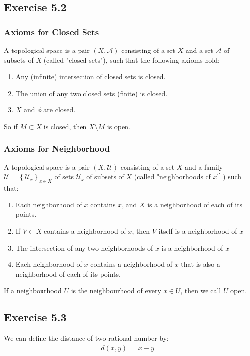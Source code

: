 \documentclass[]{ctexart}
\begin{document}
	\subsection{Exercise 5.2}
		\subsubsection{Axioms for Closed Sets}
			A topological space is a pair $(X, \mathcal{A})$ consisting of a set $X$ and a set $\mathcal{A}$ of subsets of $X$ (called "closed sets"), such that the following axioms hold:
				\begin{enumerate}
					\item Any (infinite) intersection of closed sets is closed.
					\item The union of any two closed sets (finite) is closed.
					\item $X$ and $\phi$ are closed.
				\end{enumerate}
					
			So if $M\subset X$ is closed, then $X\setminus M$ is open. 
		
		\subsubsection{Axioms for Neighborhood}
			A topological space is a pair $(X, \mathcal{U})$ consisting of a set $X$ and a family $\mathcal{U}=\left\{\mathcal{U}_{x}\right\}_{x \in X}$ of sets $\mathcal{U}_{x}$ of subsets of $X$ (called "neighborhoods of $x^{\prime \prime}$ ) such that:
				\begin{enumerate}
					\item Each neighborhood of $x$ contains $x$, and $X$ is a neighborhood of each of its points.
					\item If $V \subset X$ contains a neighborhood of $x$, then $V$ itself is a neighborhood of $x$
					\item The intersection of any two neighborhoods of $x$ is a neighborhood of $x$
					\item Each neighborhood of $x$ contains a neighborhood of $x$ that is also a neighborhood of each of its points.
				\end{enumerate}
	
			If a neighbourhood $U$ is the neighbourhood of every $x\in U$, then we call $U$ open. 
	
	\subsection{Exercise 5.3}
		We can define the distance of two rational number by:
			\begin{equation*}
			\begin{aligned}
				d(x,y)=|x-y|
			\end{aligned}
			\end{equation*}
		
\end{document}
